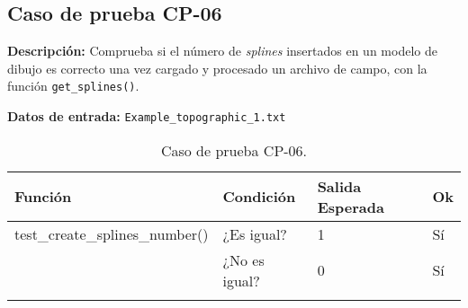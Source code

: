 \subsection{Caso de prueba CP-06}

\textbf{Descripción:} Comprueba si el número de \emph{splines} insertados en un modelo de dibujo es correcto una vez cargado y procesado un archivo de campo, con la función \texttt{get\_splines()}.

\textbf{Datos de entrada:} \texttt{Example\_topographic\_1.txt}


\begin{longtable}[]{@{}llll@{}}
\toprule
\begin{minipage}[b]{0.6\columnwidth}\raggedright\strut
Función\strut
\end{minipage} & \begin{minipage}[b]{0.20\columnwidth}\raggedright\strut
Condición\strut
\end{minipage} & \begin{minipage}[b]{0.15\columnwidth}\raggedright\strut
Salida Esperada\strut
\end{minipage} & \begin{minipage}[b]{0.05\columnwidth}\raggedright\strut
Ok\strut
\end{minipage}\tabularnewline
\midrule
\endhead
\begin{minipage}[t]{0.6\columnwidth}\raggedright\strut
\small{test\_create\_splines\_number()}\strut
\end{minipage} & \begin{minipage}[t]{0.20\columnwidth}\raggedright\strut
¿Es igual?\strut
\end{minipage} & \begin{minipage}[t]{0.15\columnwidth}\raggedright\strut
1\strut
\end{minipage} & \begin{minipage}[t]{0.05\columnwidth}\raggedright\strut
Sí\strut
\end{minipage}\tabularnewline
\begin{minipage}[t]{0.6\columnwidth}\raggedright\strut
\strut
\end{minipage} & \begin{minipage}[t]{0.20\columnwidth}\raggedright\strut
¿No es igual?\strut
\end{minipage} & \begin{minipage}[t]{0.15\columnwidth}\raggedright\strut
0\strut
\end{minipage} & \begin{minipage}[t]{0.05\columnwidth}\raggedright\strut
Sí\strut
\end{minipage}\tabularnewline

\bottomrule
\caption{Caso de prueba CP-06.}
\end{longtable}

